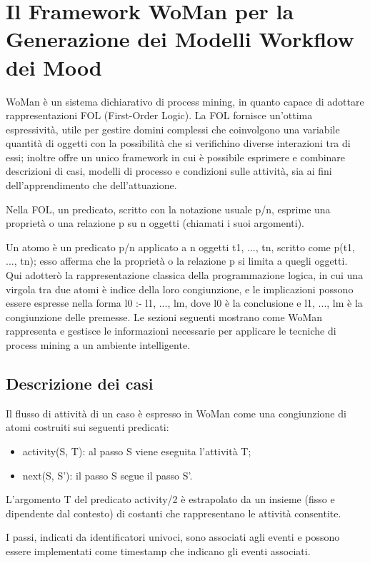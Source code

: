 \chapter{Il Framework WoMan per la Generazione dei Modelli Workflow dei Mood}
\cite{IncrLearnDailyRoutWorkflowSmartHomeEnvir} \cite{WoMan} WoMan è un sistema dichiarativo di process mining, in quanto capace di adottare rappresentazioni FOL (First-Order Logic). La FOL fornisce un'ottima espressività, utile per gestire domini complessi che coinvolgono una variabile quantità di oggetti con la possibilità che si verifichino diverse interazioni tra di essi; inoltre offre un unico framework in cui è possibile esprimere e combinare descrizioni di casi, modelli di processo e condizioni sulle attività, sia ai fini dell’apprendimento che dell’attuazione. 

Nella FOL, un predicato, scritto con la notazione usuale p/n, esprime una proprietà o una relazione p su n oggetti (chiamati i suoi argomenti). 

Un atomo è un predicato p/n applicato a n oggetti t1, ..., tn, scritto come p(t1, ..., tn); esso afferma che la proprietà o la relazione p si limita a quegli oggetti. Qui adotterò la rappresentazione classica della programmazione logica, in cui una virgola tra due atomi è indice della loro congiunzione, e le implicazioni possono essere espresse nella forma l0 :- l1, ..., lm, dove l0 è la conclusione e l1, ..., lm è la congiunzione delle premesse. Le sezioni seguenti mostrano come WoMan rappresenta e gestisce le informazioni necessarie per applicare le tecniche di process mining a un ambiente intelligente.

\section{Descrizione dei casi}
Il flusso di attività di un caso è espresso in WoMan come una congiunzione di atomi costruiti sui seguenti predicati:
\begin{itemize}
\item activity(S, T): al passo S viene eseguita l'attività T;
\item next(S, S'): il passo S segue il passo S'.
\end{itemize}

L'argomento T del predicato activity/2 è estrapolato da un insieme (fisso e dipendente dal contesto) di costanti che rappresentano le attività consentite. 

I passi, indicati da identificatori univoci, sono associati agli eventi e possono essere implementati come timestamp che indicano gli eventi associati. 

